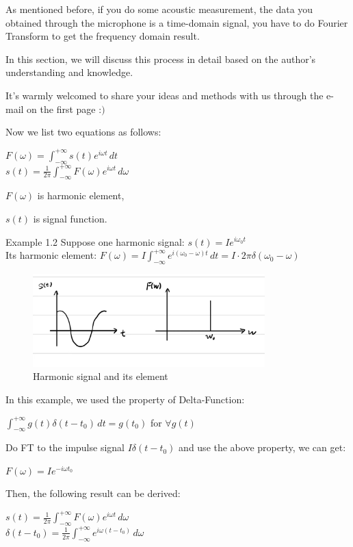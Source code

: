 \documentclass[graybox]{svmult}
\begin{document}
As mentioned before, if you do some acoustic measurement, the data you obtained through the microphone is a time-domain signal, you have to do Fourier Transform to get the frequency domain result. 

In this section, we will discuss this process in detail based on the author's understanding and knowledge. 

It's warmly welcomed to share your ideas and methods with us through the e-mail on the first page $ \text{:)} $

Now we list two equations as follows:
\begin{center}
$ F(\omega ) =  \int_{-\infty}^{+\infty} s(t)e^{i\omega t} \,dt  $ \\
$ s(t) = \frac{1}{2\pi} \int_{-\infty}^{+\infty} F(\omega)e^{i\omega t} \,d\omega  $
\end{center}

$  F(\omega ) $ is harmonic element, 

$ s(t) $ is signal function. \\

\begin{legaltext}{Example 1.2}
\indent 
Suppose one harmonic signal: $ s(t)=Ie^{i\omega_0 t} $ \\
\indent 
Its harmonic element: $ F(\omega )=I \int_{-\infty}^{+\infty} e^{i(\omega_0-\omega) t} \,dt = I\cdot2\pi\delta(\omega_0-\omega)$

\begin{figure}[h!]
    \centering
    \includegraphics[width=0.8\textwidth]{Fig.1.2.1.jpg} %
    \caption{Harmonic signal and its element}
    \label{fig:example}
\end{figure}

In this example, we used the property of Delta-Function:
\begin{center}
$ \int_{-\infty}^{+\infty}g(t)\delta(t-t_0) \,dt = g(t_0) $ for $ \forall g(t) $
\end{center}

Do FT to the impulse signal $ I\delta(t-t_0)$ and use the above property, we can get:
\begin{center}
    $ F(\omega) = Ie^{-i\omega t_0} $
\end{center} 

Then, the following result can be derived:
\begin{center}
    $ s(t) = \frac{1}{2\pi} \int_{-\infty}^{+\infty} F(\omega)e^{i\omega t} \,d\omega  $ \\
    $ \delta(t-t_0) = \frac{1}{2\pi} \int_{-\infty}^{+\infty} e^{i\omega (t-t_0)} \,d\omega  $
\end{center}

\end{legaltext}
\end{document}
